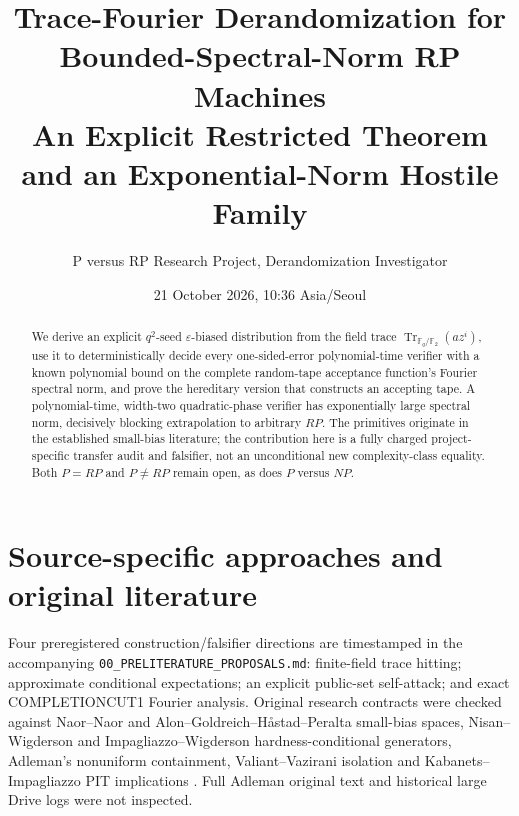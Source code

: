 \documentclass[11pt]{article}
\title{Trace-Fourier Derandomization for Bounded-Spectral-Norm RP Machines\\
\large An Explicit Restricted Theorem and an Exponential-Norm Hostile Family}
\author{P versus RP Research Project, Derandomization Investigator}
\date{21 October 2026, 10:36 Asia/Seoul}
\begin{document}
\maketitle
\begin{abstract}
We derive an explicit $q^2$-seed $\varepsilon$-biased distribution from the field trace $\operatorname{Tr}_{\mathbb F_q/\mathbb F_2}(az^i)$, use it to deterministically decide every one-sided-error polynomial-time verifier with a known polynomial bound on the complete random-tape acceptance function's Fourier spectral norm, and prove the hereditary version that constructs an accepting tape. A polynomial-time, width-two quadratic-phase verifier has exponentially large spectral norm, decisively blocking extrapolation to arbitrary $RP$. The primitives originate in the established small-bias literature; the contribution here is a fully charged project-specific transfer audit and falsifier, not an unconditional new complexity-class equality. Both $P=RP$ and $P\ne RP$ remain open, as does $P$ versus $NP$.
\end{abstract}
\section{Source-specific approaches and original literature}
Four preregistered construction/falsifier directions are timestamped in the accompanying \texttt{00\_PRELITERATURE\_PROPOSALS.md}: finite-field trace hitting; approximate conditional expectations; an explicit public-set self-attack; and exact COMPLETIONCUT1 Fourier analysis. Original research contracts were checked against Naor--Naor and Alon--Goldreich--H\r{a}stad--Peralta small-bias spaces, Nisan--Wigderson and Impagliazzo--Wigderson hardness-conditional generators, Adleman's nonuniform containment, Valiant--Vazirani isolation and Kabanets--Impagliazzo PIT implications \cite{naornaor1993,aghp1992,nw1994,iw1997,adleman1978,vv1986,ki2004}. Full Adleman original text and historical large Drive logs were not inspected.
\end{document}
